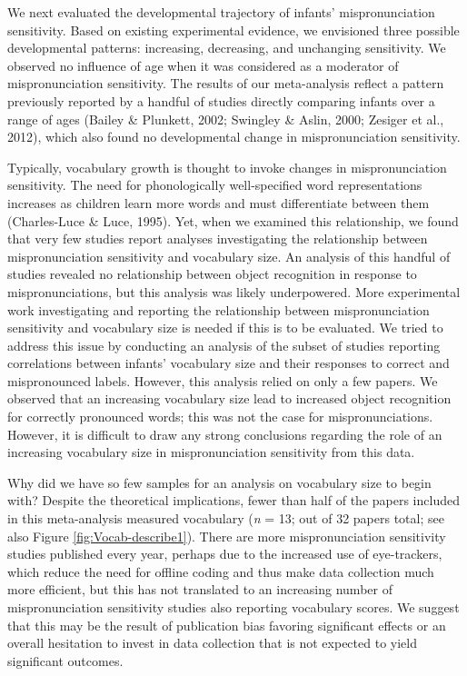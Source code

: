 \documentclass[man]{apa6}
\theoremstyle{definition}
\theoremstyle{definition}
\theoremstyle{definition}
\theoremstyle{remark}
\begin{document}
We next evaluated the developmental trajectory of infants'
mispronunciation sensitivity. Based on existing experimental evidence,
we envisioned three possible developmental patterns: increasing,
decreasing, and unchanging sensitivity. We observed no influence of age
when it was considered as a moderator of mispronunciation sensitivity.
The results of our meta-analysis reflect a pattern previously reported
by a handful of studies directly comparing infants over a range of ages
(Bailey \& Plunkett, 2002; Swingley \& Aslin, 2000; Zesiger et al.,
2012), which also found no developmental change in mispronunciation
sensitivity.

Typically, vocabulary growth is thought to invoke changes in
mispronunciation sensitivity. The need for phonologically well-specified
word representations increases as children learn more words and must
differentiate between them (Charles-Luce \& Luce, 1995). Yet, when we
examined this relationship, we found that very few studies report
analyses investigating the relationship between mispronunciation
sensitivity and vocabulary size. An analysis of this handful of studies
revealed no relationship between object recognition in response to
mispronunciations, but this analysis was likely underpowered. More
experimental work investigating and reporting the relationship between
mispronunciation sensitivity and vocabulary size is needed if this is to
be evaluated. We tried to address this issue by conducting an analysis
of the subset of studies reporting correlations between infants'
vocabulary size and their responses to correct and mispronounced labels.
However, this analysis relied on only a few papers. We observed that an
increasing vocabulary size lead to increased object recognition for
correctly pronounced words; this was not the case for mispronunciations.
However, it is difficult to draw any strong conclusions regarding the
role of an increasing vocabulary size in mispronunciation sensitivity
from this data.

Why did we have so few samples for an analysis on vocabulary size to
begin with? Despite the theoretical implications, fewer than half of the
papers included in this meta-analysis measured vocabulary (\emph{n} =
13; out of 32 papers total; see also Figure \ref{fig:Vocab-describe1}).
There are more mispronunciation sensitivity studies published every
year, perhaps due to the increased use of eye-trackers, which reduce the
need for offline coding and thus make data collection much more
efficient, but this has not translated to an increasing number of
mispronunciation sensitivity studies also reporting vocabulary scores.
We suggest that this may be the result of publication bias favoring
significant effects or an overall hesitation to invest in data
collection that is not expected to yield significant outcomes.
\end{document}
